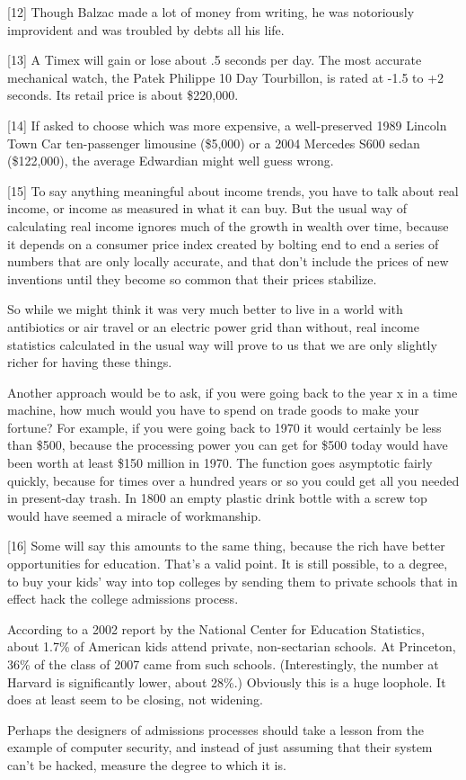 {[}12{]} Though Balzac made a lot of money from writing, he was
notoriously improvident and was troubled by debts all his life.

{[}13{]} A Timex will gain or lose about .5 seconds per day. The most
accurate mechanical watch, the Patek Philippe 10 Day Tourbillon, is
rated at -1.5 to +2 seconds. Its retail price is about \$220,000.

{[}14{]} If asked to choose which was more expensive, a well-preserved
1989 Lincoln Town Car ten-passenger limousine (\$5,000) or a 2004
Mercedes S600 sedan (\$122,000), the average Edwardian might well guess
wrong.

{[}15{]} To say anything meaningful about income trends, you have to
talk about real income, or income as measured in what it can buy. But
the usual way of calculating real income ignores much of the growth in
wealth over time, because it depends on a consumer price index created
by bolting end to end a series of numbers that are only locally
accurate, and that don't include the prices of new inventions until they
become so common that their prices stabilize.

So while we might think it was very much better to live in a world with
antibiotics or air travel or an electric power grid than without, real
income statistics calculated in the usual way will prove to us that we
are only slightly richer for having these things.

Another approach would be to ask, if you were going back to the year x
in a time machine, how much would you have to spend on trade goods to
make your fortune? For example, if you were going back to 1970 it would
certainly be less than \$500, because the processing power you can get
for \$500 today would have been worth at least \$150 million in 1970.
The function goes asymptotic fairly quickly, because for times over a
hundred years or so you could get all you needed in present-day trash.
In 1800 an empty plastic drink bottle with a screw top would have seemed
a miracle of workmanship.

{[}16{]} Some will say this amounts to the same thing, because the rich
have better opportunities for education. That's a valid point. It is
still possible, to a degree, to buy your kids' way into top colleges by
sending them to private schools that in effect hack the college
admissions process.

According to a 2002 report by the National Center for Education
Statistics, about 1.7\% of American kids attend private, non-sectarian
schools. At Princeton, 36\% of the class of 2007 came from such schools.
(Interestingly, the number at Harvard is significantly lower, about
28\%.) Obviously this is a huge loophole. It does at least seem to be
closing, not widening.

Perhaps the designers of admissions processes should take a lesson from
the example of computer security, and instead of just assuming that
their system can't be hacked, measure the degree to which it is.
